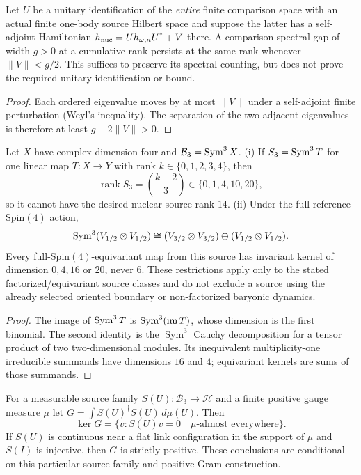 \documentclass[12pt,a4paper]{article}
\begin{document}
\begin{proposition}
\label{p12:prop:v357-shell-weyl-stability}
Let $U$ be a unitary identification of the \emph{entire} finite
comparison space with an actual finite one-body source Hilbert
space and suppose the latter has a self-adjoint Hamiltonian
$h_{\rm nuc}=Uh_{\omega,\kappa}U^\dagger+V$ there.
A comparison spectral gap of width $g>0$ at a cumulative rank
persists at the same rank whenever $\lVert V\rVert<g/2$.
This suffices to preserve its spectral counting, but does not
prove the required unitary identification or bound.
\end{proposition}
\begin{proof}
Each ordered eigenvalue moves by at most $\lVert V\rVert$
under a self-adjoint finite perturbation (Weyl's inequality).
The separation of the two adjacent eigenvalues is therefore
at least $g-2\lVert V\rVert>0$.
\end{proof}
\begin{proposition}
\label{p12:prop:v357-degree-three-source-no-go}
Let $X$ have complex dimension four and $\mathcal B_3=\operatorname{Sym}^3X$.
(i) If $S_3=\operatorname{Sym}^3T$ for one linear map $T:X\to Y$ with
rank $k\in\{0,1,2,3,4\}$, then
\[
 \operatorname{rank}S_3=\binom{k+2}{3}
 \in\{0,1,4,10,20\},
\]
so it cannot have the desired nuclear source rank $14$.
(ii) Under the full reference $\mathrm{Spin}(4)$ action,
\[
 \operatorname{Sym}^3(V_{1/2}\otimes V_{1/2})
 \cong(V_{3/2}\otimes V_{3/2})\oplus
 (V_{1/2}\otimes V_{1/2}).
\]
Every full-$\mathrm{Spin}(4)$-equivariant map from this source
has invariant kernel of dimension $0,4,16$ or $20$, never $6$.
These restrictions apply only to the stated factorized/equivariant
source classes and do not exclude a source using the already
selected oriented boundary or non-factorized baryonic dynamics.
\end{proposition}
\begin{proof}
The image of $\operatorname{Sym}^3T$ is $\operatorname{Sym}^3(\operatorname{im}T)$,
whose dimension is the first binomial.  The second identity is the
$\operatorname{Sym}^3$ Cauchy decomposition for a tensor product
of two two-dimensional modules.  Its inequivalent multiplicity-one
irreducible summands have dimensions $16$ and $4$; equivariant
kernels are sums of those summands.
\end{proof}
\begin{proposition}
\label{p12:prop:v357-positive-gram-kernel}
For a measurable source family $S(U):\mathcal B_3\to\mathcal H$
and a finite positive gauge measure $\mu$ let
$G=\int S(U)^\dagger S(U)\,d\mu(U)$. Then
\[
 \boxed{\ker G=\{v:S(U)v=0\quad\mu\text{-almost everywhere}\}.}
\]
If $S(U)$ is continuous near a flat link configuration in the
support of $\mu$ and $S(I)$ is injective, then $G$ is strictly
positive. These conclusions are conditional on this particular
source-family and positive Gram construction.
\end{proposition}
\end{document}
